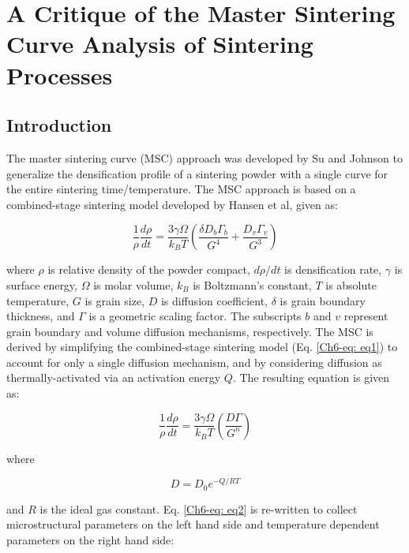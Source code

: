 \chapter{A Critique of the Master Sintering Curve Analysis of Sintering Processes}

\section{Introduction}
The master sintering curve (MSC) approach was developed by Su and Johnson \cite{Su1996} to generalize the densification profile of a sintering powder with a single curve for the entire sintering time/temperature. The MSC approach is based on a combined-stage sintering model developed by Hansen et al, \cite{Hansen1992} given as:

\begin{equation}
\label{Ch6-eq: eq1}
\frac{1}{\rho} \frac{d\rho}{dt} = \frac{3 \gamma \Omega}{k_{B}T} \left( \frac{\delta D_{b} \Gamma_{b}}{G^{4}} + \frac{D_{v} \Gamma_{v}}{G^{3}} \right)
\end{equation}

\noindent where $\rho$ is relative density of the powder compact, $d\rho/dt$ is densification rate, $\gamma$ is surface energy, $\Omega$ is molar volume, $k_{B}$ is Boltzmann's constant, $T$ is absolute temperature, $G$ is grain size, $D$ is diffusion coefficient, $\delta$ is grain boundary thickness, and $\Gamma$ is a geometric scaling factor. The subscripts $b$ and $v$ represent grain boundary and volume diffusion mechanisms, respectively. The MSC is derived by simplifying the combined-stage sintering model (Eq. \ref{Ch6-eq: eq1}) to account for only a single diffusion mechanism, and by considering diffusion as thermally-activated via an activation energy $Q$. The resulting equation is given as:

\begin{equation}
\label{Ch6-eq: eq2}
\frac{1}{\rho} \frac{d\rho}{dt} = \frac{3 \gamma \Omega}{k_{B}T} \left( \frac{D \Gamma}{G^{n}} \right)
\end{equation}

\noindent where

\begin{equation}
\label{Ch6-eq: eq3}
D = D_{0}e^{-Q/RT}
\end{equation}

\noindent and $R$ is the ideal gas constant. Eq. \ref{Ch6-eq: eq2} is re-written to collect microstructural parameters on the left hand side and temperature dependent parameters on the right hand side:

